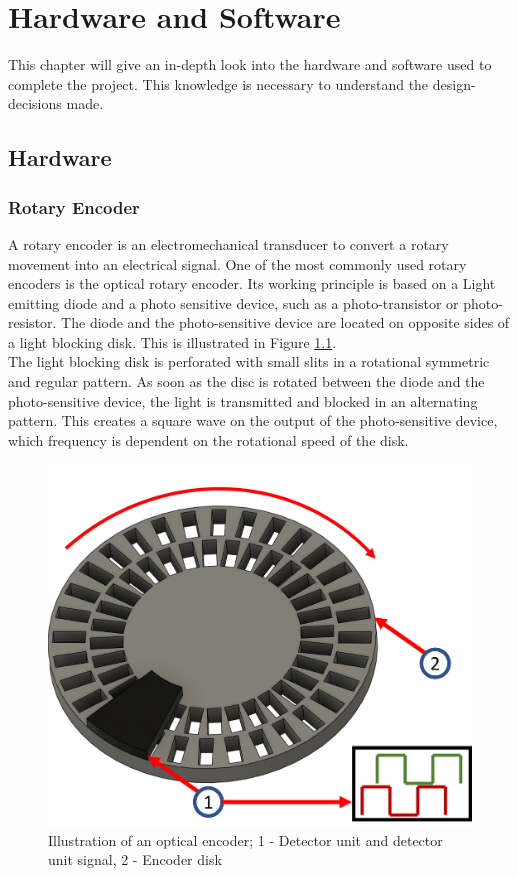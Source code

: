 \chapter{Hardware and Software}
\label{hardwareandsoftware}
 
This chapter will give an in-depth look into the hardware and software used to complete the project. This knowledge is necessary to understand the design-decisions made.
 
\section{Hardware}
 
\subsection{Rotary Encoder}
A rotary encoder is an electromechanical transducer to convert a rotary movement into an electrical signal. One of the most commonly used rotary encoders is the optical rotary encoder.
Its working principle is based on a Light emitting diode and a photo sensitive device, such as a photo-transistor or photo-resistor. The diode and the photo-sensitive device are located on opposite sides of a light blocking disk. This is illustrated in Figure \ref{HardEnc}.\\
The light blocking disk is perforated with small slits in a rotational symmetric and regular pattern. As soon as the disc is rotated between the diode and the photo-sensitive device, the light is transmitted and blocked in an alternating pattern.
This creates a square wave on the output of the photo-sensitive device, which frequency is dependent on the rotational speed of the disk.\cite{MotionOptischerEncoder}
 
\begin{figure}
    \begin{center}
    \includegraphics[width=12cm]{Pictures/HardEnc.png}
    \caption[Illustration of an optical encoder]{Illustration of an optical encoder; 1 - Detector unit and detector unit signal, 2 - Encoder disk}
    \label{HardEnc}
    \end{center}
\end{figure}
 
